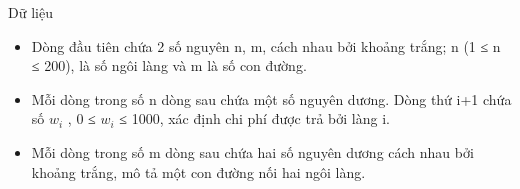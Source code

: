 Dữ liệu
\begin{itemize}
	\item     Dòng đầu tiên chứa 2 số nguyên n, m, cách nhau bởi khoảng trắng; n (1 ≤ n ≤ 200), là số ngôi làng và m là số con đường.   
	\item     Mỗi dòng trong số n dòng sau chứa một số nguyên dương. Dòng thứ i+1 chứa số $w_{i}$    , 0  ≤  $w_{i}$    ≤ 1000, xác định chi phí được trả bởi làng i.   
	\item     Mỗi dòng trong số m dòng sau chứa hai số nguyên dương cách nhau bởi khoảng trắng, mô tả một con đường nối hai ngôi làng.   
\end{itemize}